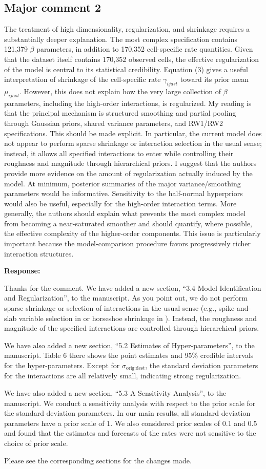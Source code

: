 \documentclass[11pt,a4paper]{article}
\newlength{\replyspace}
\newenvironment{response}{\par\addvspace{\replyspace}\nopagebreak\textbf{\textcolor{replyblue}{Response:}}\par\begingroup\color{replyblue}}{\par\endgroup\vspace{\replyspace}}
\newcommand{\refcomment}[2]{\par\Needspace{5\baselineskip}\subsection*{#1}#2\par}
\begin{document}
\refcomment{Major comment 2}{
The treatment of high dimensionality, regularization, and shrinkage requires a substantially deeper explanation. The most complex specification contains 121,379 $\beta$ parameters, in addition to 170,352 cell-specific rate quantities. Given that the dataset itself contains 170,352 observed cells, the effective regularization of the model is central to its statistical credibility. Equation (3) gives a useful interpretation of shrinkage of the cell-specific rate $\gamma_{ijast}$ toward its prior mean $\mu_{ijast}$. However, this does not explain how the very large collection of $\beta$ parameters, including the high-order interactions, is regularized. My reading is that the principal mechanism is structured smoothing and partial pooling through Gaussian priors, shared variance parameters, and RW1/RW2 specifications. This should be made explicit. In particular, the current model does not appear to perform sparse shrinkage or interaction selection in the usual sense; instead, it allows all specified interactions to enter while controlling their roughness and magnitude through hierarchical priors. I suggest that the authors provide more evidence on the amount of regularization actually induced by the model. At minimum, posterior summaries of the major variance/smoothing parameters would be informative. Sensitivity to the half-normal hyperpriors would also be useful, especially for the high-order interaction terms. More generally, the authors should explain what prevents the most complex model from becoming a near-saturated smoother and should quantify, where possible, the effective complexity of the higher-order components. This issue is particularly important because the model-comparison procedure favors progressively richer interaction structures.
}
\begin{response}
Thanks for the comment. We have added a new section, ``3.4 Model Identification and Regularization'', to the manuscript. As you point out, we do not perform sparse shrinkage or selection of interactions in the usual sense (e.g., spike-and-slab variable selection in \cite{george1993variable} or horseshoe shrinkage in \cite{carvalho2010horseshoe}). Instead, the roughness and magnitude of the specified interactions are controlled through hierarchical priors. 

We have also added a new section, ``5.2 Estimates of Hyper-parameters'', to the manuscript. Table 6 there shows the point estimates and 95\% credible intervals for the hyper-parameters. Except for $\sigma_{\text{orig:dest}}$, the standard deviation parameters for the interactions are all relatively small, indicating strong regularization. 

We have also added a new section, ``5.3 A Sensitivity Analysis'', to the manuscript. We conduct a sensitivity analysis with respect to the prior scale for the standard deviation parameters. In our main results, all standard deviation parameters have a prior scale of 1. We also considered prior scales of 0.1 and 0.5 and found that the estimates and forecasts of the rates were not sensitive to the choice of prior scale.

Please see the corresponding sections for the changes made.
\end{response}
\end{document}
